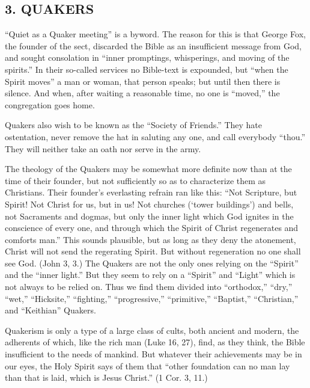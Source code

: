 \documentclass[
]{book}
\begin{document}
\subsection*{\texorpdfstring{3. QUAKERS}{3. QUAKERS}}\label{quakers}

``Quiet as a Quaker meeting'' is a byword. The reason for this is that George Fox, the founder of the sect, discarded the Bible as an insufficient message from God, and sought consolation in ``inner promptings, whisperings, and moving of the spirits.'' In their so-called services no Bible-text is expounded, but ``when the Spirit moves'' a man or woman, that person speaks; but until then there is silence. And when, after waiting a reasonable time, no one is ``moved,'' the congregation goes home.

Quakers also wish to be known as the ``Society of Friends.'' They hate ostentation, never remove the hat in saluting any one, and call everybody ``thou.'' They will neither take an oath nor serve in the army.

The theology of the Quakers may be somewhat more definite now than at the time of their founder, but not sufficiently so as to characterize them as Christians. Their founder's everlasting refrain ran like this: ``Not Scripture, but Spirit! Not Christ for us, but in us! Not churches (`tower buildings') and bells, not Sacraments and dogmas, but only the inner light which God ignites in the conscience of every one, and through which the Spirit of Christ regenerates and comforts man.'' This sounds plausible, but as long as they deny the atonement, Christ will not send the regerating Spirit. But without regeneration no one shall see God. (John 3, 3.) The Quakers are not the only ones relying on the ``Spirit'' and the ``inner light.'' But they seem to rely on a ``Spirit'' and ``Light'' which is not always to be relied on. Thus we find them divided into ``orthodox,'' ``dry,'' ``wet,'' ``Hicksite,'' ``fighting,'' ``progressive,'' ``primitive,'' ``Baptist,'' ``Christian,'' and ``Keithian'' Quakers.

Quakerism is only a type of a large class of cults, both ancient and modern, the adherents of which, like the rich man (Luke 16, 27), find, as they think, the Bible insufficient to the needs of mankind. But whatever their achievements may be in our eyes, the Holy Spirit says of them that ``other foundation can no man lay than that is laid, which is Jesus Christ.'' (1 Cor. 3, 11.)
\end{document}
